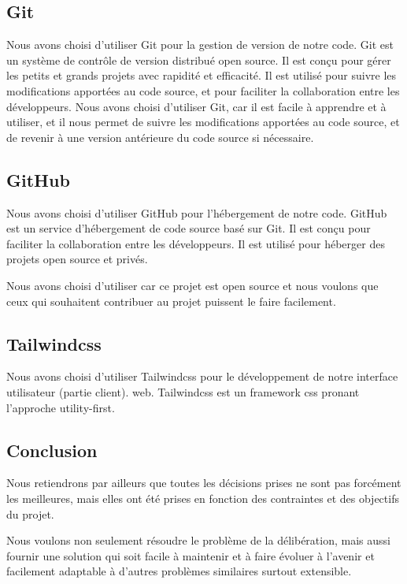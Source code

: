 \subsection{Git}\label{subsec: conception-git}
Nous avons choisi d'utiliser Git pour la gestion de version de notre code. Git
est un système de contrôle de version distribué open source. Il est conçu pour
gérer les petits et grands projets avec rapidité et efficacité. Il est
utilisé pour suivre les modifications apportées au code source, et pour
faciliter la collaboration entre les développeurs. Nous avons choisi d'utiliser
Git, car il est facile à apprendre et à utiliser, et il nous permet de suivre
les modifications apportées au code source, et de revenir à une version
antérieure du code source si nécessaire.

\subsection{GitHub}\label{subsec: conception-github}
Nous avons choisi d'utiliser GitHub pour l'hébergement de notre code. GitHub est
un service d'hébergement de code source basé sur Git. Il est conçu pour
faciliter la collaboration entre les développeurs. Il est utilisé pour
héberger des projets open source et privés.

Nous avons choisi d'utiliser car ce projet est open source et nous voulons que ceux qui
souhaitent contribuer au projet puissent le faire facilement.

\subsection{Tailwindcss}\label{subsec: conception-tailwind}
Nous avons choisi d'utiliser Tailwindcss pour le développement de notre interface utilisateur (partie client).
web. Tailwindcss est un framework css pronant l'approche utility-first.

\subsection*{Conclusion}\label{subsec: conception-conclusion-choix-techniques}
Nous retiendrons par ailleurs que toutes les décisions prises ne sont pas
forcément les meilleures, mais elles ont été prises en fonction des
contraintes et des objectifs du projet.

Nous voulons non seulement résoudre le problème de la délibération, mais
aussi fournir une solution qui soit facile à maintenir et à faire évoluer à
l'avenir et facilement adaptable à d'autres problèmes similaires surtout extensible.

